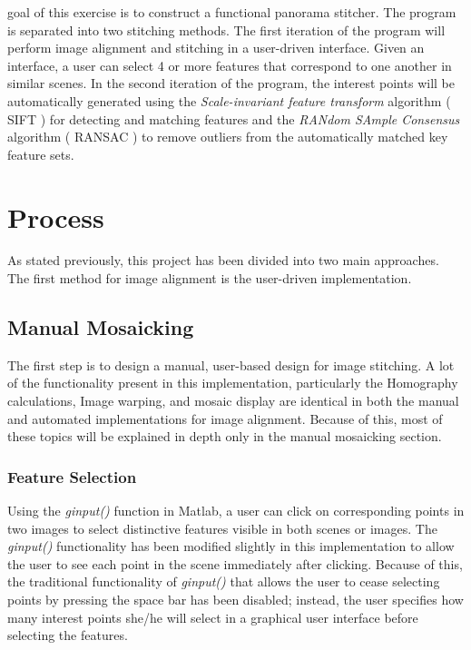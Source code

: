 \documentclass[12pt,journal,compsoc]{IEEEtran}
\begin{document}
% 
% 
% 
% 
 goal of this exercise is to construct a functional panorama stitcher. The program is separated into two stitching methods. The first iteration of the program will perform image alignment and stitching in a user-driven interface. Given an interface, a user can select 4 or more features that correspond to one another in similar scenes. In the second iteration of the program, the interest points will be automatically generated using the \textit{Scale-invariant feature transform} algorithm ( SIFT ) for detecting and matching features and the \textit{RANdom SAmple Consensus} algorithm ( RANSAC ) to remove outliers from the automatically matched key feature sets.


\section{Process}
As stated previously, this project has been divided into two main approaches. The first method for image alignment is the user-driven implementation.

\subsection{Manual Mosaicking}
The first step is to design a manual, user-based design for image stitching. A lot of the functionality present in this implementation, particularly the Homography calculations, Image warping, and mosaic display are identical in both the manual and automated implementations for image alignment. Because of this, most of these topics will be explained in depth only in the manual mosaicking section.

\subsubsection{Feature Selection}
Using the \textit{ginput()} function in Matlab, a user can click on corresponding points in two images to select distinctive features visible in both scenes or images. The \textit{ginput()} functionality has been modified slightly in this implementation to allow the user to see each point in the scene immediately after clicking. Because of this, the traditional functionality of \textit{ginput()} that allows the user to cease selecting points by pressing the space bar has been disabled; instead, the user specifies how many interest points she/he will select in a graphical user interface before selecting the features.
\end{document}
